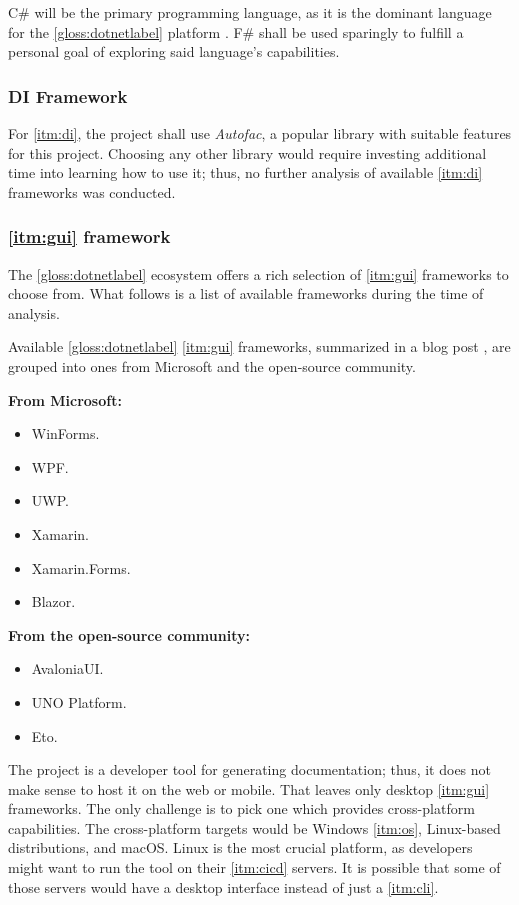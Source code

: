 C\# will be the primary programming language, as it is the dominant language for the \ref{gloss:dotnetlabel} platform \cite{noauthor_tiobe_2022}.
F\# shall be used sparingly to fulfill a personal goal of exploring said language's capabilities.

\subsubsection{DI Framework}

For \ref{itm:di}, the project shall use \textit{Autofac}, a popular library with suitable features for this project. Choosing any other library would require investing additional time into learning how to use it; thus, no further analysis of available \ref{itm:di} frameworks was conducted.

\subsubsection{\ref{itm:gui} framework} \label{sec:guiFramework}

The \ref{gloss:dotnetlabel} ecosystem offers a rich selection of \ref{itm:gui} frameworks to choose from. What follows is a list of available frameworks during the time of analysis.

Available \ref{gloss:dotnetlabel} \ref{itm:gui} frameworks, summarized in a blog post \cite{stilgar_state_2018}, are grouped into ones from Microsoft and the open-source community.

\textbf{From Microsoft:}
\begin{itemize}
    \item WinForms.
    \item WPF.
    \item UWP.
    \item Xamarin.
    \item Xamarin.Forms.
    \item Blazor.
\end{itemize}

\textbf{From the open-source community:}
\begin{itemize}
    \item AvaloniaUI.
    \item UNO Platform.
    \item Eto.
\end{itemize}

The project is a developer tool for generating documentation; thus, it does not make sense to host it on the web or mobile. That leaves only desktop \ref{itm:gui} frameworks. The only challenge is to pick one which provides cross-platform capabilities. The cross-platform targets would be Windows \ref{itm:os}, Linux-based distributions, and macOS.
Linux is the most crucial platform, as developers might want to run the tool on their \ref{itm:cicd} servers. It is possible that some of those servers would have a desktop interface instead of just a \ref{itm:cli}.

